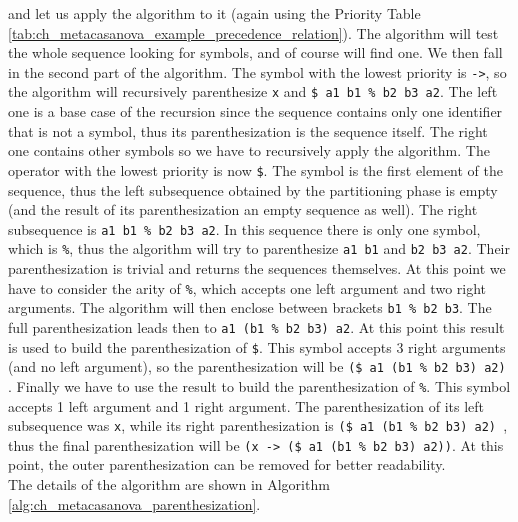 \noindent
and let us apply the algorithm to it (again using the Priority Table \ref{tab:ch_metacasanova_example_precedence_relation}). The algorithm will test the whole sequence looking for symbols, and of course will find one. We then fall in the second part of the algorithm. The symbol with the lowest priority is \texttt{->}, so the algorithm will recursively parenthesize \texttt{x} and \texttt{\$ a1 b1 \% b2 b3 a2}. The left one is a base case of the recursion since the sequence contains only one identifier that is not a symbol, thus its parenthesization is the sequence itself. The right one contains other symbols so we have to recursively apply the algorithm. The operator with the lowest priority is now \texttt{\$}. The symbol is the first element of the sequence, thus the left subsequence obtained by the partitioning phase is empty (and the result of its parenthesization an empty sequence as well). The right subsequence is \texttt{a1 b1 \% b2 b3 a2}. In this sequence there is only one symbol, which is \texttt{\%}, thus the algorithm will try to parenthesize \texttt{a1 b1} and \texttt{b2 b3 a2}. Their parenthesization is trivial and returns the sequences themselves. At this point we have to consider the arity of \texttt{\%}, which accepts one left argument and two right arguments. The algorithm will then enclose between brackets \texttt{b1 \% b2 b3}. The full parenthesization leads then to \texttt{a1 (b1 \% b2 b3) a2}. At this point this result is used to build the parenthesization of \texttt{\$}. This symbol accepts 3 right arguments (and no left argument), so the parenthesization will be \texttt{(\$ a1 (b1 \% b2 b3) a2) }. Finally we have to use the result to build the parenthesization of \texttt{\%}. This symbol accepts 1 left argument and 1 right argument. The parenthesization of its left subsequence was \texttt{x}, while its right parenthesization is \texttt{(\$ a1 (b1 \% b2 b3) a2) }, thus the final parenthesization will be \texttt{(x -> (\$ a1 (b1 \% b2 b3) a2))}. At this point, the outer parenthesization can be removed for better readability.\\
The details of the algorithm are shown in Algorithm \ref{alg:ch_metacasanova_parenthesization}.

